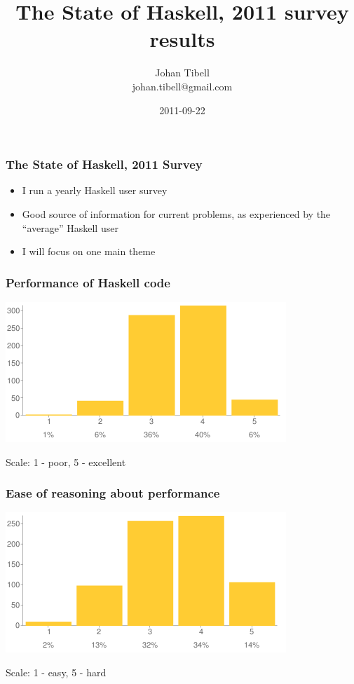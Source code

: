 \documentclass[xetex,mathserif,serif]{beamer}
\title{The State of Haskell, 2011 survey results}
\author{Johan Tibell\\johan.tibell@gmail.com}
\date{2011-09-22}
\begin{document}
\frame{\titlepage}

\begin{frame}
  \frametitle{The State of Haskell, 2011 Survey}
  \begin{itemize}
  \item I run a yearly Haskell user survey
  \item Good source of information for current problems, as
    experienced by the ``average'' Haskell user
  \item I will focus on one main theme
  \end{itemize}
\end{frame}

\begin{frame}
  \frametitle{Performance of Haskell code}
  \begin{center}
  \includegraphics[width=\textwidth]{performance}
  \end{center}
  Scale: 1 - poor, 5 - excellent
\end{frame}

\begin{frame}
  \frametitle{Ease of reasoning about performance}
  \begin{center}
  \includegraphics[width=\textwidth]{reasoning}
  \end{center}
  Scale: 1 - easy, 5 - hard
\end{frame}
\end{document}
